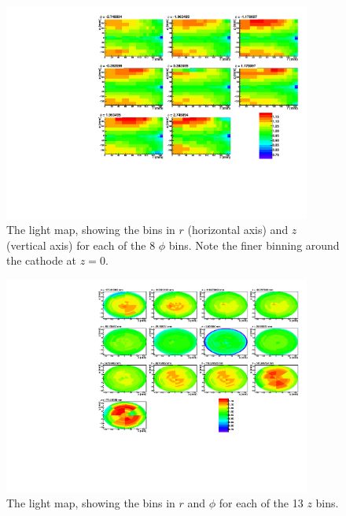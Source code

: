 \documentclass[herrin-thesis.tex]{subfiles}
\begin{document}
\begin{figure}
\centering
\includegraphics[width=0.9\textwidth]{./plots/lightmap_binned_phi_slices.pdf}
\caption[Light map \(\phi\) slices]{The light map, showing the bins in \(r\) (horizontal axis) and \(z\) (vertical axis) for each of the 8 \(\phi\) bins. Note the finer binning around the cathode at \(z=0\).}
\label{fig:lightmap_binned_phi_slices}
\end{figure}

\begin{figure}
\centering
\includegraphics[width=0.9\textwidth]{./plots/lightmap_binned_z_slices.pdf}
\caption[Light map \(z\) slices]{The light map, showing the bins in \(r\) and \(\phi\) for each of the 13 \(z\) bins.}
\label{fig:lightmap_binned_z_slices}
\end{figure}
\end{document}
